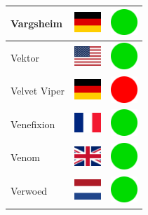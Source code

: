 \documentclass[12pt, a4paper, twoside]{report}
\begin{document}
\begin{center}
\begin{longtable}{|p{5cm}|p{2cm}|p{2cm}|}
 Vargsheim                                                  & \includegraphics[width=1cm]{../4x3/de} &   \includegraphics[width=1cm]{../likes/y} \\ \hline
 Vektor                                                     & \includegraphics[width=1cm]{../4x3/us} &   \includegraphics[width=1cm]{../likes/y} \\ \hline
 Velvet Viper                                               & \includegraphics[width=1cm]{../4x3/de} &   \includegraphics[width=1cm]{../likes/n} \\ \hline
 Venefixion                                                 & \includegraphics[width=1cm]{../4x3/fr} &   \includegraphics[width=1cm]{../likes/y} \\ \hline
 Venom                                                      & \includegraphics[width=1cm]{../4x3/gb} &   \includegraphics[width=1cm]{../likes/y} \\ \hline
 Verwoed                                                    & \includegraphics[width=1cm]{../4x3/nl} &   \includegraphics[width=1cm]{../likes/y} \\ \hline

\end{longtable}
\end{center}
\end{document}
